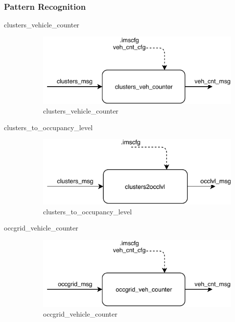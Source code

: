 \subsubsection{Pattern Recognition}
\begin{description}

\item[clusters\_vehicle\_counter] \hfill

\begin{figure}[ht!]
\centering
\includegraphics[scale=1]{fig/3/clusters_veh_counter.pdf}
\caption{clusters\_vehicle\_counter}
\label{clusters_vehicle_counter}
\end{figure}


\item[clusters\_to\_occupancy\_level] \hfill
\begin{figure}[ht!]
\centering
\includegraphics[scale=1]{fig/3/clusters2occlvl.pdf}
\caption{clusters\_to\_occupancy\_level}
\label{clusters_to_occupancy_level}
\end{figure}


\item[occgrid\_vehicle\_counter] \hfill

\begin{figure}[ht!]
\centering
\includegraphics[scale=1]{fig/3/occgrid_veh_counter.pdf}
\caption{occgrid\_vehicle\_counter}
\label{occgrid_vehicle_counter}
\end{figure}


\end{description}
